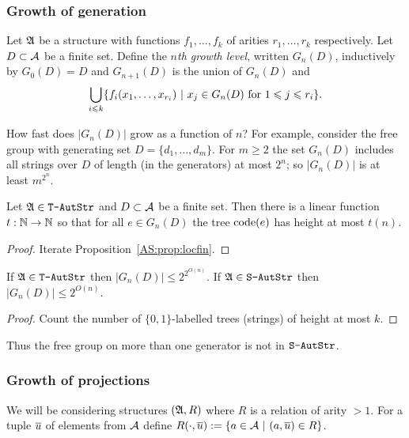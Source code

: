 \subsubsection*{Growth of generation}

\begin{definition} \label{dfn:growth} \cite{KhNe95}
Let $\mathfrak{A}$ be a structure with functions $f_1, \dots, f_k$ of arities $r_1, \dots, r_k$ respectively. 
Let $D \subset {\mathcal A}$ be a finite set.
Define the
{\em $n$th growth level}, written $G_n(D)$, inductively by $G_0(D) = D$
and $G_{n+1}(D)$ is the union of $G_n(D)$ and
\[
\bigcup_{i\leqslant k} \{f_i(x_1,\dots,x_{r_i}) \ \vert \  x_j \in G_n(D) \text{ for } 1 \leqslant j \leqslant r_i\}.
\]
\end{definition}

How fast does $|G_n(D)|$ grow as a function of $n$?  For
example, consider the free group with generating
set $D = \{d_1, \dots, d_m\}$. For $m \geq 2$ the set $G_n(D)$ includes all strings over $D$ of length (in the generators)
at most $2^n$; so  $|G_n(D)|$ is at least $m^{2^{n}}$.

\begin{proposition} \cite{KhNe95} 
 \label{AS:prop:growth}
Let $\mathfrak{A} \in \mbox{\tt T-AutStr}$ and $D \subset {\mathcal A}$ be a finite set. Then there is a
linear function $t:\mathbb{N} \rightarrow \mathbb{N}$ so that for all $e \in G_n(D)$ the tree ${\rm code}({e})$ has
height at most $t(n)$.
\end{proposition}
\begin{proof}
 Iterate Proposition~\ref{AS:prop:locfin}.
\end{proof}

\begin{corollary} 
If $\mathfrak{A} \in \mbox{\tt T-AutStr}$ then $|G_n(D)| \leq 2^{2^{O(n)}}$. If $\mathfrak{A} \in \mbox{\tt S-AutStr}$ then 
$|G_n(D)| \leq 2^{O(n)}$.
\end{corollary}
\begin{proof}
Count the number of $\{0,1\}$-labelled trees (strings) of height at most $k$.
\end{proof}

Thus the free group on more than one generator is not in $\mbox{\tt S-AutStr}$.

\subsubsection*{Growth of projections}

We will be considering structures $(\mathfrak{A},R)$ where $R$ is a relation of arity $> 1$. For a tuple $\mbox{$\overline {u}$}$ of elements from ${\mathcal A}$ define
$R(\cdot,\mbox{$\overline {u}$}) := \{a \in {\mathcal A} \ \vert \  (a,\mbox{$\overline {u}$}) \in R\}$.

